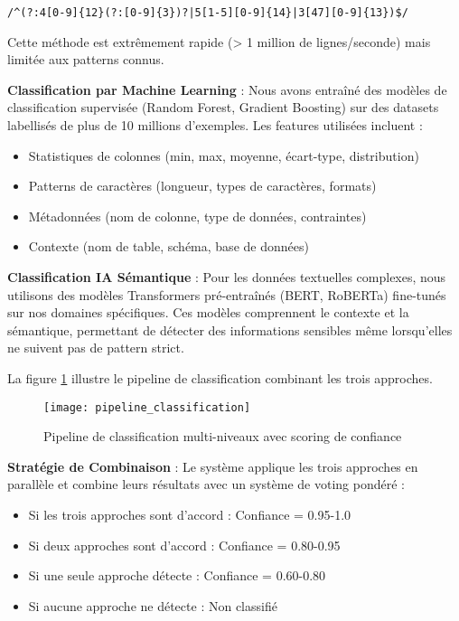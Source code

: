\texttt{/\^{}(?:4[0-9]\{12\}(?:[0-9]\{3\})?|5[1-5][0-9]\{14\}|3[47][0-9]\{13\})\$/}

Cette méthode est extrêmement rapide (> 1 million de lignes/seconde) mais limitée aux patterns connus.

\textbf{Classification par Machine Learning} : Nous avons entraîné des modèles de classification supervisée (Random Forest, Gradient Boosting) sur des datasets labellisés de plus de 10 millions d'exemples. Les features utilisées incluent :
\begin{itemize}
    \item Statistiques de colonnes (min, max, moyenne, écart-type, distribution)
    \item Patterns de caractères (longueur, types de caractères, formats)
    \item Métadonnées (nom de colonne, type de données, contraintes)
    \item Contexte (nom de table, schéma, base de données)
\end{itemize}

\textbf{Classification IA Sémantique} : Pour les données textuelles complexes, nous utilisons des modèles Transformers pré-entraînés (BERT, RoBERTa) fine-tunés sur nos domaines spécifiques. Ces modèles comprennent le contexte et la sémantique, permettant de détecter des informations sensibles même lorsqu'elles ne suivent pas de pattern strict.

La figure \ref{fig:pipeline_classification} illustre le pipeline de classification combinant les trois approches.

\begin{figure}[htpb]
\centering
\texttt{[image: pipeline\_classification]}
\caption{Pipeline de classification multi-niveaux avec scoring de confiance}
\label{fig:pipeline_classification}
\end{figure}

\textbf{Stratégie de Combinaison} : Le système applique les trois approches en parallèle et combine leurs résultats avec un système de voting pondéré :
\begin{itemize}
    \item Si les trois approches sont d'accord : Confiance = 0.95-1.0
    \item Si deux approches sont d'accord : Confiance = 0.80-0.95
    \item Si une seule approche détecte : Confiance = 0.60-0.80
    \item Si aucune approche ne détecte : Non classifié
\end{itemize}

